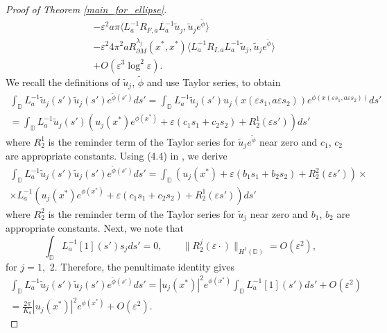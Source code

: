 \documentclass[12pt,a4paper]{amsart}
\numberwithin{equation}{section}
\theoremstyle{plain}
\theoremstyle{definition}
\begin{document}
\begin{proof}[Proof of Theorem \ref{main_for_ellipse}]
\begin{align}
		\nonumber& - \varepsilon^2 a \pi \langle L_a^{-1} R_{F,a} L_a^{-1}\tilde{u}_j, \tilde{u}_je^{\tilde{\phi}} \rangle\\
		\nonumber& - \varepsilon^2  4\pi^2 a R_{\partial M}^{\lambda_j}(x^*,x^*)\langle L_a^{-1}R_{I,a} L_a^{-1}\tilde{u}_j, \tilde{u}_je^{\tilde{\phi}}\rangle\\
		\nonumber& + O(\varepsilon^3\log^2\varepsilon). 
	\end{align}
	We recall the definitions of $\tilde u_j$, $\tilde \phi$ and use Taylor series, to obtain
	\begin{multline*}
		\int_{\mathbb{D}} L_a^{-1}\tilde{u}_j(s') \tilde{u}_j(s') e^{\tilde{\phi}(s')} ds' = \int_{\mathbb{D}} L_a^{-1}\tilde{u}_j(s') u_j(x(\varepsilon s_1,a\varepsilon s_2)) e^{\phi(x(\varepsilon s_1,a\varepsilon s_2))} ds'\\
		= \int_{\mathbb{D}} L_a^{-1}\tilde{u}_j(s') \left( u_j(x^*)e^{\phi(x^*)} + \varepsilon(c_1s_1 + c_2s_2) + R_2^1(\varepsilon s') \right) ds'
	\end{multline*}
	where $R_2^1$ is the reminder term of the Taylor series for $\tilde u_j e^{\tilde \phi}$ near zero and $c_1$, $c_2$ are appropriate constants.
	Using (4.4) in \cite{NursultanovTzouTzou}, we derive 
	\begin{multline*}
		\int_{\mathbb{D}} L_a^{-1}\tilde{u}_j(s') \tilde{u}_j(s') e^{\tilde{\phi}(s')} ds' = \int_{\mathbb{D}} \left( u_j(x^*) + \varepsilon(b_1s_1 + b_2s_2) + R_2^2(\varepsilon s') \right) \times\\
		\times L_a^{-1} \left( u_j(x^*)e^{\phi(x^*)} + \varepsilon(c_1s_1 + c_2s_2) + R_2^1(\varepsilon s')\right) ds'
	\end{multline*}
	where $R_2^2$ is the reminder term of the Taylor series for $\tilde u_j$ near zero and $b_1$, $b_2$ are appropriate constants. Next, we note that 
	\begin{equation*}
		\int_{\mathbb{D}} L_a^{-1}[1](s')s_j ds' = 0, \qquad \|R^{j}_2(\varepsilon \cdot)\|_{H^1(\mathbb D)} = O(\varepsilon^2), 
	\end{equation*}
	for $j=1,$ $2$. Therefore, the penultimate identity gives
    \begin{multline*}
		\int_{\mathbb{D}} L_a^{-1}\tilde{u}_j(s') \tilde{u}_j(s') e^{\tilde{\phi}(s')} ds' = |u_j(x^*)|^2e^{\phi(x^*)} \int_{\mathbb D} L_a^{-1}[1](s')ds' + O(\varepsilon^2)\\ 
        = \frac{2\pi}{K_a}|u_j(x^*)|^2e^{\phi(x^*)} + O(\varepsilon^2).
    \end{multline*}
	

\end{proof}
\end{document}
